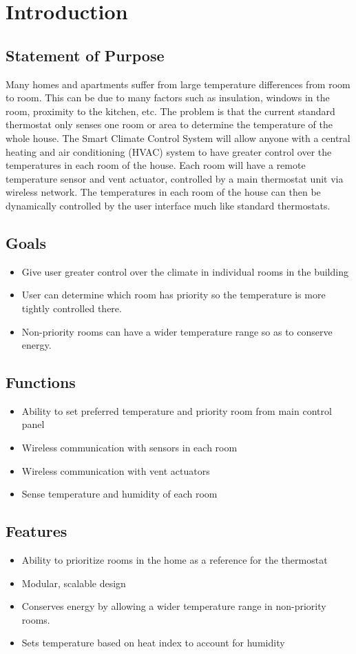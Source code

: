 \section{Introduction}
\subsection{Statement of Purpose}
Many homes and apartments suffer from large temperature differences from room to room. This can be due to many factors such as insulation, windows in the room, proximity to the kitchen, etc.  The problem is that the current standard thermostat only senses one room or area to determine the temperature of the whole house.  The Smart Climate Control System will allow anyone with a central heating and air conditioning (HVAC) system to have greater control over the temperatures in each room of the house.  Each room will have a remote temperature sensor and vent actuator, controlled by a main thermostat unit via wireless network.  The temperatures in each room of the house can then be dynamically controlled by the user interface much like standard thermostats.

\subsection{Goals}
\begin{itemize}
\item
Give user greater control over the climate in individual rooms in the building
\item
User can determine which room has priority so the temperature is more tightly controlled there.
\item
Non-priority rooms can have a wider temperature range so as to conserve energy.
\end{itemize}

\subsection{Functions}
\begin{itemize}
\item
Ability to set preferred temperature and priority room from main control panel
\item
Wireless communication with sensors in each room
\item
Wireless communication with vent actuators
\item
Sense temperature and humidity of each room
\end{itemize}

\subsection{Features}
\begin{itemize}
\item
Ability to prioritize rooms in the home as a reference for the thermostat
\item
Modular, scalable design
\item
Conserves energy by allowing a wider temperature range in non-priority rooms.
\item
Sets temperature based on heat index to account for humidity
\end{itemize}

